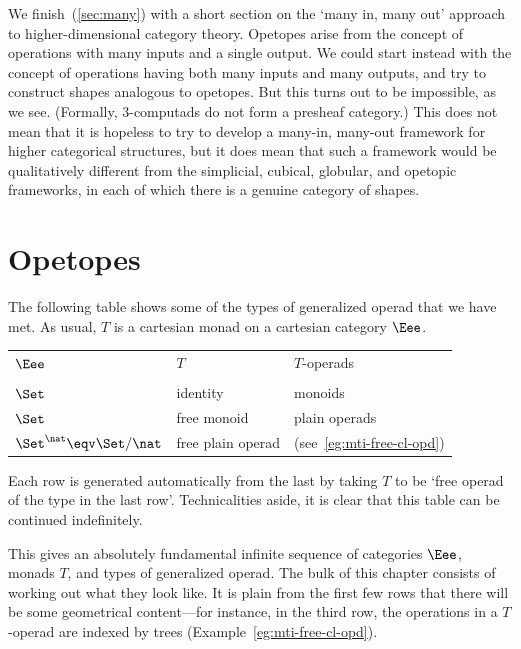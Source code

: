 We finish~(\ref{sec:many}) with a short section on the `many%
%
%
in, many out'
approach to higher-dimensional category theory.  Opetopes arise from the
concept of operations with many inputs and a single output.  We could start
instead with the concept of operations having both many inputs and many
outputs, and try to construct shapes analogous to opetopes.  But this turns
out to be impossible, as we see.  (Formally, 3-computads do not form a
presheaf category.)  This does not mean that it is hopeless to try to
develop a many-in, many-out framework for higher categorical structures,
but it does mean that such a framework would be qualitatively different
from the simplicial, cubical, globular, and opetopic frameworks, in each of
which there is a genuine category of shapes.





\section{Opetopes}


The following table shows some of the types of generalized operad that we
have met.  As usual, $T$ is a cartesian monad on a cartesian category
$\Eee$.
%
\begin{center}
\begin{tabular}{lll}
$\Eee$		&$T$			&$T$-operads			\\
		&			&				\\
$\Set$		&identity		&monoids			\\
$\Set$		&free monoid		&plain operads		\\
$\Set^\nat \eqv \Set/\nat$	&
		 free plain operad	&
			(see~\ref{eg:mti-free-cl-opd})
\end{tabular}
\end{center}
%
Each row is generated automatically from the last by taking $T$ to be
`free%
%
%
operad of the type in the last row'.  Technicalities aside, it is clear
that this table can be continued indefinitely.

This gives an absolutely fundamental infinite sequence of categories
$\Eee$, monads $T$, and types of generalized operad.  The bulk of this
chapter consists of working out what they look like.  It is plain
from the first few rows that there will be some geometrical content---for
instance, in the third row, the operations in a $T$-operad are indexed by
trees (Example~\ref{eg:mti-free-cl-opd}).

